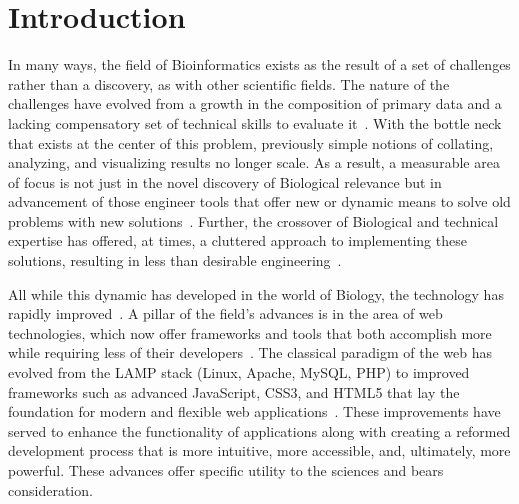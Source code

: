 \documentclass[10pt]{report}
\begin{document}
\newpage






\chapter{Introduction}
In many ways, the field of Bioinformatics exists as the result of a set of challenges rather than a discovery, as with other scientific fields. The nature of the challenges have evolved from a growth in the composition of primary data and a lacking compensatory set of technical skills to evaluate it~\cite{lawlorEngineeringBioinformaticsBuilding2015}. With the bottle neck that exists at the center of this problem, previously simple notions of collating, analyzing, and visualizing results no longer scale. As a result, a measurable area of focus is not just in the novel discovery of Biological relevance but in advancement of those engineer tools that offer new or dynamic means to solve old problems with new solutions~\cite{segalDevelopingScientificSoftware2008}. Further, the crossover of Biological and technical expertise has offered, at times, a cluttered approach to implementing these solutions, resulting in less than desirable engineering~\cite{vermaLackSoftwareEngineering2013}.

All while this dynamic has developed in the world of Biology, the technology has rapidly improved~\cite{teufelCurrentBioinformaticsTools2006}. A pillar of the field's advances is in the area of web technologies, which now offer frameworks and tools that both accomplish more while requiring less of their developers~\cite{managementassociationBioinformaticsConceptsMethodologies2013a}. The classical paradigm of the web has evolved from the LAMP stack (Linux, Apache, MySQL, PHP) to improved frameworks such as advanced JavaScript, CSS3, and HTML5 that lay the foundation for modern and flexible web applications~\cite{wangOpenSourceLibraries2015}. These improvements have served to enhance the functionality of applications along with creating a reformed development process that is more intuitive, more accessible, and, ultimately, more powerful. These advances offer specific utility to the sciences and bears consideration.
\end{document}
